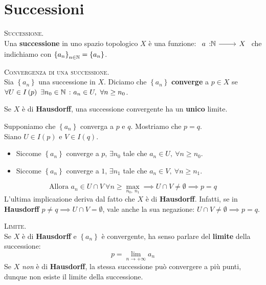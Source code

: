 \section{Successioni}
\begin{define}\textsc{Successione.}\\
Una \textbf{successione} in uno spazio topologico $X$ è una funzione:
$\funz{a}{\naturalset}{X}$ che indichiamo con $\left\{a_n\right\}_{n\in\mathbb{N}}=\left\{a_n\right\}$.
\end{define}
\begin{define}\textsc{Convergenza di una successione.}\\
Sia $\left\{a_n\right\}$ una successione in $X$. Diciamo che $\left\{a_n\right\}$ \textbf{converge} a $p\in X$ se $\forall U\in I\left(p\right)\ \exists n_0\in \mathbb{N}\ \colon a_n\in U,\ \forall n\geq n_0$.
\end{define}
\begin{observe}
	Se $X$ è di \textbf{Hausdorff}, una successione convergente ha un \textbf{unico} limite.
\end{observe}
\begin{demonstration}
	Supponiamo che $\left\{a_n\right\}$ converga a $p$ e $q$. Mostriamo che $p=q$.\\
	Siano $U\in I\left(p\right)$ e $V\in I\left(q\right)$.
	\begin{itemize}
		\item Siccome $\left\{a_n\right\}$ converge a $p$, $\exists n_0$ tale che $a_n\in U,\ \forall n\geq n_0$.
		\item Siccome $\left\{a_n\right\}$ converge a $1$, $\exists n_1$ tale che $a_n\in V,\ \forall n\geq n_1$.
	\end{itemize}
\begin{equation*}
\text{Allora } a_n\in U\cap V\ \forall n\geq \max_{n_0,\ n_1}\implies U\cap V\neq \emptyset\implies p=q
\end{equation*}
L'ultima implicazione deriva dal fatto che $X$ è di \textbf{Hausdorff}. Infatti, se in \textbf{Hausdorff} $p\neq q\implies U\cap V = \emptyset$, vale anche la sua negazione: $U\cap V\neq \emptyset\implies p = q$.
\end{demonstration}
\begin{define}\textsc{Limite.}\\
Se $X$ è di \textbf{Hausdorff} e $\left\{a_n\right\}$ è convergente, ha senso parlare del \textbf{limite} della successione:
\begin{equation}
p=\lim_{n \to +\infty}a_n
\end{equation}
Se $X$ \textit{non} è di \textbf{Hausdorff}, la stessa successione può convergere a più punti, dunque non esiste il limite della successione.
\end{define}
